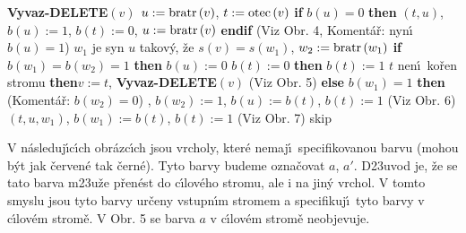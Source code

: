 {\bf Vyvaz-DELETE$\left(v\right)$\newline 
$u:=\operatorname{bratr}\left(v\right)$}, $t:=\operatorname{otec}\left(v\right)$\newline 
{\bf if} $b\left(u\right)=0$ {\bf then}\newline 
\phantom{---}{\bf Rotace}$\left(t,u\right)$, $b\left(u\right):=1$, $b\left(t\right):=0$, $u:=\operatorname{bratr}\left(v\right)$\newline 
{\bf endif\newline}
(Viz Obr. 4, Koment\'a\v r: nyn\'\i\ $b\left(u\right)=1$)\newline 
$w_1$ je syn $u$ takov\'y, \v ze $s\left(v\right)=s\left(w_1\right)$, $w_2:=\operatorname{bratr}\left(w_1\right)$\newline 
{\bf if} $b\left(w_1\right)=b\left(w_2\right)=1$ {\bf then}\newline 
\phantom{---}$b\left(u\right):=0$\newline 
\phantom{---}{\bf if} $b\left(t\right):=0$ {\bf then}\newline 
\phantom{------}$b\left(t\right):=1$\newline 
\phantom{---}{\bf else}\newline 
\phantom{------}{\bf if} $t$ nen\'\i\ ko\v ren stromu {\bf then}\newline \phantom{---------}$v:=t$, {\bf Vyvaz-DELETE}$\left(v\right)$\newline 
\phantom{------}{\bf endif}\newline 
\phantom{---}{\bf endif} (Viz Obr. 5)\newline 
{\bf else}\newline 
\phantom{---}{\bf if} $b\left(w_1\right)=1$ {\bf then}\newline 
(Koment\'a\v r: $b\left(w_2\right)=0$)\newline 
\phantom{------}{\bf Rotace$\left(t,u\right)$}, $b\left(w_2\right):=1$, $b\left(u\right):=b\left(t\right)$, $b\left(t\right):=1$ (Viz Obr. 6)\newline 
\phantom{---}{\bf else}\newline 
\phantom{------}{\bf Dvojita-rotace}$\left(t,u,w_1\right)$, $b\left(w_1\right):=b\left(t\right)$, $b\left(t\right):=1$ (Viz Obr. 7)\newline
\phantom{---}{\bf endif\newline 
endif}
skip

\flushpar V n\'asleduj\'\i c\'\i ch obr\'azc\'\i ch jsou vrcholy, kter\'e 
nemaj\'\i\ specifikovanou barvu (mohou b\'yt jak \v cerven\'e tak \v cern\'e).
Tyto barvy budeme ozna\v covat $a$, $a'$. D\accent23uvod je, \v ze se 
tato barva m\accent23u\v ze p\v ren\'est do c\'\i lov\'eho stromu, ale 
i na jin\'y vrchol. V tomto smyslu jsou tyto barvy ur\v ceny vstupn\'\i m 
stromem a specifikuj\'\i\ tyto barvy v c\'\i lov\'em strom\v e. V Obr. 5 
se barva $a$ v c\'\i lov\'em strom\v e neobjevuje.
\medskip


